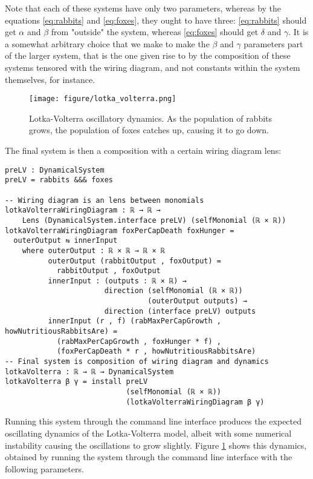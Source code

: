 Note that each of these systems have only two parameters, whereas by the equations \ref{eq:rabbits} and \ref{eq:foxes}, they ought to have three: \ref{eq:rabbits} should get $\alpha$ and $\beta$ from "outside" the system, whereas \ref{eq:foxes} should get $\delta$ and $\gamma$. It is a somewhat arbitrary choice that we make to make the $\beta$ and $\gamma$ parameters part of the larger system, that is the one given rise to by the composition of these systems tensored with the wiring diagram, and not constants within the system themselves, for instance.

\begin{figure}
    \centering
    \texttt{[image: figure/lotka\_volterra.png]}
    \caption{Lotka-Volterra oscillatory dynamics. As the population of rabbits grows, the population of foxes catches up, causing it to go down.}
    \label{fig:lvfig}
\end{figure}

The final system is then a composition with a certain wiring diagram lens:

\begin{verbatim}
preLV : DynamicalSystem
preLV = rabbits &&& foxes

-- Wiring diagram is an lens between monomials
lotkaVolterraWiringDiagram : ℝ → ℝ → 
    Lens (DynamicalSystem.interface preLV) (selfMonomial (ℝ × ℝ))
lotkaVolterraWiringDiagram foxPerCapDeath foxHunger = 
  outerOutput ⇆ innerInput
    where outerOutput : ℝ × ℝ → ℝ × ℝ
          outerOutput (rabbitOutput , foxOutput) = 
            rabbitOutput , foxOutput
          innerInput : (outputs : ℝ × ℝ) → 
                       direction (selfMonomial (ℝ × ℝ)) 
                                 (outerOutput outputs) →
                       direction (interface preLV) outputs
          innerInput (r , f) (rabMaxPerCapGrowth , howNutritiousRabbitsAre) = 
            (rabMaxPerCapGrowth , foxHunger * f) , 
            (foxPerCapDeath * r , howNutritiousRabbitsAre)
-- Final system is composition of wiring diagram and dynamics
lotkaVolterra : ℝ → ℝ → DynamicalSystem
lotkaVolterra β γ = install preLV 
                            (selfMonomial (ℝ × ℝ))
                            (lotkaVolterraWiringDiagram β γ)
\end{verbatim}

Running this system through the command line interface produces the expected oscillating dynamics of the Lotka-Volterra model, albeit with some numerical instability causing the oscillations to grow slightly. Figure \ref{fig:lvfig} shows this dynamics, obtained by running the system through the command line interface with the following parameters.

